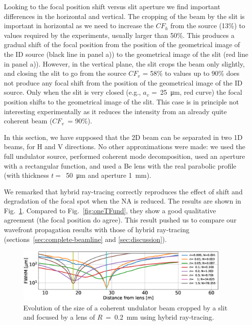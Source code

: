 \documentclass{iucr}              %
\begin{document}
Looking to the focal position shift versus slit aperture we find important differences in the horizontal and vertical. The cropping of the beam by the slit is important in horizontal as we need to increase the $CF_h$ from the source (13\%) to values required by the experiments, usually larger than 50\%. This produces a gradual shift of the focal position from the position of the geometrical image of the ID source (black line in panel a)) to the geometrical image of the slit (red line in panel a)). However, in the vertical plane, the slit crops the beam only slightly, and closing the slit to go from the source $CF_v$ = 58\% to values up to 90\% does not produce any focal shift from the position of the geometrical image of the ID source. Only when the slit is very closed (e.g., $a_v$ =~\SI{25}{\micro\meter}, red curve) the focal position shifts to the geometrical image of the slit. This case is in principle not interesting experimentally as it reduces the intensity from an already quite coherent beam ($CF_v$~= 90\%). 

In this section, we have supposed that the 2D beam can be separated in two 1D beams, for H and V directions. No other approximations were made: we used the full undulator source, performed coherent mode decomposition, used an aperture with a rectangular function, and used a Be lens with the real parabolic profile (with thickness $t=$~\SI{50}{\micro\meter} and aperture \SI{1}{\milli\meter}). 

We remarked that hybrid ray-tracing \cite{codeHYBRID} correctly reproduces the effect of shift and degradation of the focal spot when the NA is reduced. The results are shown in Fig.~\ref{fig:oneTF_hybrid}. Compared to Fig.~\ref{fig:oneTFund}, they show a good qualitative agreement (the focal position do agree). This result pushed us to compare our wavefront propagation results with those of hybrid ray-tracing (sections~\ref{sec:complete-beamline} and \ref{sec:discussion}).


\begin{figure}
    \centering
    
    \includegraphics[width=0.95\textwidth]{figures/oneTF_ShadowHybrid_R200um.eps}
    
    \caption{Evolution of the size of a coherent undulator beam cropped by a slit and focused by a lens of $R$~=~\SI{0.2}{\milli\meter} using hybrid ray-tracing.
    }
    \label{fig:oneTF_hybrid}
\end{figure}
\end{document}
